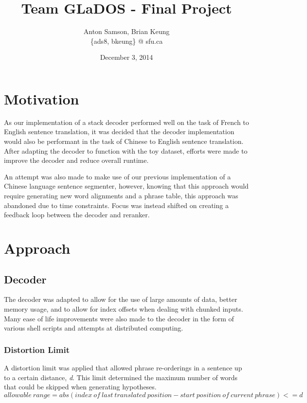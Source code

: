 \documentclass[letterpaper]{article}
\title{Team GLaDOS - Final Project}
\author{Anton Samson, Brian Keung\\
    \{ads8, bkeung\} @ sfu.ca}
\date{December 3, 2014}
\begin{document}
\maketitle

\section{Motivation}
\indent \indent As our implementation of a stack decoder performed well on the task of French to English sentence translation, it was decided that the decoder implementation would also be performant in the task of Chinese to English sentence translation. After adapting the decoder to function with the toy dataset, efforts were made to improve the decoder and reduce overall runtime.
\newline

An attempt was also made to make use of our previous implementation of a Chinese language sentence segmenter, however, knowing that this approach would require generating new word alignments and a phrase table, this approach was abandoned due to time constraints. Focus was instead shifted on creating a feedback loop between the decoder and reranker.

\section{Approach}

\subsection{Decoder}

\indent \indent The decoder was adapted to allow for the use of large amounts of data, better memory usage, and to allow for index offsets when dealing with chunked inputs. Many ease of life improvements were also made to the decoder in the form of various shell scripts and attempts at distributed computing.

\subsubsection{Distortion Limit}

\indent \indent A distortion limit was applied that allowed phrase re-orderings in a sentence up to a certain distance, \textit{d}. This limit determined the maximum number of words that could be skipped when generating hypotheses.
\[allowable\:range = abs(index\:of\:last\:translated\:position - start\:position\:of\:current\:phrase) <= d\]
\end{document}
